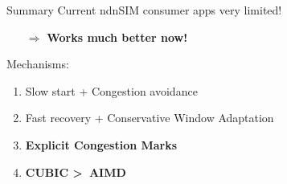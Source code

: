 \begin{frame}{Summary}
Current ndnSIM consumer apps very limited! 

\begin{itemize}
\item [$\Rightarrow$] \textbf{Works much better now!}
\end{itemize}

\pause
Mechanisms:
\begin{enumerate}
\item Slow start + Congestion avoidance
\pause
\item Fast recovery + Conservative Window Adaptation
\pause
\item \textbf{Explicit Congestion Marks}
\pause
\item \textbf{CUBIC \textgreater\ AIMD}
\end{enumerate}


\end{frame}



%
%
%
%
%
%
%
%
%
%
%
%
%
%



